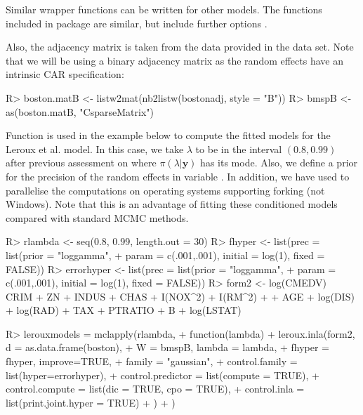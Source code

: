 \documentclass[article]{jss}
\begin{document}
Similar wrapper functions can be written for other models. The functions
included in package  are similar, but include further options
\citep[see,][for details]{Bivandetal:2014}.



Also, the adjacency matrix is taken from the data provided in the 
data set.
Note that we will be using a binary adjacency matrix as the random
effects have an intrinsic CAR specification:
\begin{Schunk}
\begin{Sinput}
R> boston.matB <- listw2mat(nb2listw(bostonadj, style = "B"))
R> bmspB <- as(boston.matB, "CsparseMatrix")
\end{Sinput}
\end{Schunk}

Function  is used in the example below to compute the fitted
models for the Leroux et al. model.  In this case, we take $\lambda$ to be in
the interval $(0.8,0.99)$ after previous assessment on where
$\pi(\lambda|\mathbf{y})$ has its mode. Also, we define a prior for the
precision of the random effects in variable .  In addition, we
have used  to parallelise the computations on operating systems supporting forking (not Windows). Note that this is an
advantage of fitting these conditioned models compared with standard MCMC methods.

\begin{Schunk}
\begin{Sinput}
R> rlambda <- seq(0.8, 0.99, length.out = 30)
R> fhyper <- list(prec = list(prior = "loggamma", 
+     param = c(.001,.001), initial = log(1), fixed = FALSE))
R> errorhyper <- list(prec = list(prior = "loggamma",
+     param = c(.001,.001), initial = log(1), fixed = FALSE))
R> form2 <- log(CMEDV) ~ CRIM + ZN + INDUS + CHAS + I(NOX^2) + I(RM^2) + 
+      AGE + log(DIS) + log(RAD) + TAX + PTRATIO + B + log(LSTAT)
\end{Sinput}
\end{Schunk}

\begin{Schunk}
\begin{Sinput}
R> lerouxmodels = mclapply(rlambda,
+          function(lambda) {
+                  leroux.inla(form2, d = as.data.frame(boston), 
+  			W = bmspB, lambda = lambda,
+                          fhyper = fhyper, improve=TRUE,
+                          family = "gaussian",
+  			control.family = list(hyper=errorhyper),
+                          control.predictor = list(compute = TRUE),
+                          control.compute = list(dic = TRUE, cpo = TRUE),
+                          control.inla = list(print.joint.hyper = TRUE)
+                  )
+          })
\end{Sinput}
\end{Schunk}
\end{document}
